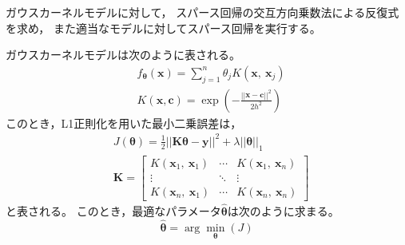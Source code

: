 \documentclass[class=jsarticle, crop=false, dvipdfmx, fleqn]{standalone}
\begin{document}
\section{}

ガウスカーネルモデルに対して，
スパース回帰の交互方向乗数法による反復式を求め，
また適当なモデルに対してスパース回帰を実行する。


ガウスカーネルモデルは次のように表される。
\begin{align}
	& f_{\bm{\theta}} (\bm{x}) = \sum_{j=1}^{n} \theta_j K(\bm{x},\ \bm{x}_j) \\
	& K(\bm{x}, \bm{c}) = \exp(-\frac{||\bm{x} - \bm{c}||^2}{2 h^2})
\end{align}
このとき，L1正則化を用いた最小二乗誤差は，
\begin{align}
	& J(\bm{\theta}) = \frac{1}{2} ||\bm{K \theta} - \bm{y}||^2 + \lambda ||\bm{\theta}||_1 \\
	& \bm{K} =
		\begin{bmatrix}
			K(\bm{x}_1,\ \bm{x}_1) & \cdots & K(\bm{x}_1,\ \bm{x}_n) \\
			\vdots & \ddots & \vdots \\
			K(\bm{x}_n,\ \bm{x}_1) & \cdots & K(\bm{x}_n,\ \bm{x}_n)
		\end{bmatrix}
\end{align}
と表される。
このとき，最適なパラメータ\(\hat{\bm{\theta}}\)は次のように求まる。
\begin{equation}
	\hat{\bm{\theta}} = \arg\min_{\bm{\theta}} (J)
\end{equation}
\end{document}
